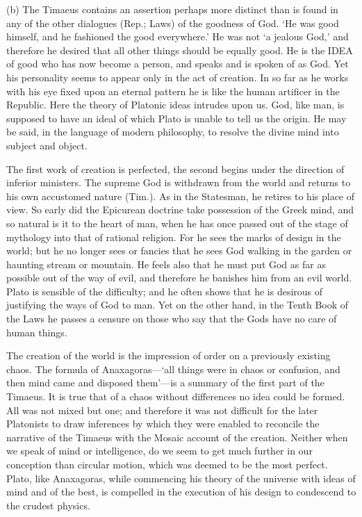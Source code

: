 (b) The Timaeus contains an assertion perhaps more distinct than is found
in any of the other dialogues (Rep.; Laws) of the goodness of God. ‘He was
good himself, and he fashioned the good everywhere.’ He was not ‘a jealous
God,’ and therefore he desired that all other things should be equally
good. He is the IDEA of good who has now become a person, and speaks and
is spoken of as God. Yet his personality seems to appear only in the act
of creation. In so far as he works with his eye fixed upon an eternal
pattern he is like the human artificer in the Republic. Here the theory of
Platonic ideas intrudes upon us. God, like man, is supposed to have an
ideal of which Plato is unable to tell us the origin. He may be said, in
the language of modern philosophy, to resolve the divine mind into subject
and object.

The first work of creation is perfected, the second begins under the
direction of inferior ministers. The supreme God is withdrawn from the
world and returns to his own accustomed nature (Tim.). As in the
Statesman, he retires to his place of view. So early did the Epicurean
doctrine take possession of the Greek mind, and so natural is it to the
heart of man, when he has once passed out of the stage of mythology into
that of rational religion. For he sees the marks of design in the world;
but he no longer sees or fancies that he sees God walking in the garden or
haunting stream or mountain. He feels also that he must put God as far as
possible out of the way of evil, and therefore he banishes him from an
evil world. Plato is sensible of the difficulty; and he often shows that
he is desirous of justifying the ways of God to man. Yet on the other
hand, in the Tenth Book of the Laws he passes a censure on those who say
that the Gods have no care of human things.

The creation of the world is the impression of order on a previously
existing chaos. The formula of Anaxagoras—‘all things were in chaos
or confusion, and then mind came and disposed them’—is a summary of
the first part of the Timaeus. It is true that of a chaos without
differences no idea could be formed. All was not mixed but one; and
therefore it was not difficult for the later Platonists to draw inferences
by which they were enabled to reconcile the narrative of the Timaeus with
the Mosaic account of the creation. Neither when we speak of mind or
intelligence, do we seem to get much further in our conception than
circular motion, which was deemed to be the most perfect. Plato, like
Anaxagoras, while commencing his theory of the universe with ideas of mind
and of the best, is compelled in the execution of his design to condescend
to the crudest physics.

